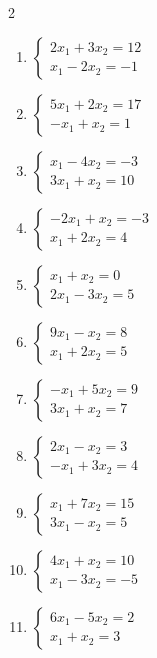 \begin{multicols}{2}
\begin{enumerate}[label=\arabic*., leftmargin=*]
\item $\begin{cases}2x_1+3x_2=12\\x_1-2x_2=-1\end{cases}$

\item $\begin{cases}5x_1+2x_2=17\\-x_1+x_2=1\end{cases}$

\item $\begin{cases}x_1-4x_2=-3\\3x_1+x_2=10\end{cases}$

\item $\begin{cases}-2x_1+x_2=-3\\x_1+2x_2=4\end{cases}$

\item $\begin{cases}x_1+x_2=0\\2x_1-3x_2=5\end{cases}$

\item $\begin{cases}9x_1-x_2=8\\x_1+2x_2=5\end{cases}$

\item $\begin{cases}-x_1+5x_2=9\\3x_1+x_2=7\end{cases}$

\item $\begin{cases}2x_1-x_2=3\\-x_1+3x_2=4\end{cases}$

\item $\begin{cases}x_1+7x_2=15\\3x_1-x_2=5\end{cases}$

\item $\begin{cases}4x_1+x_2=10\\x_1-3x_2=-5\end{cases}$

\item $\begin{cases}6x_1-5x_2=2\\x_1+x_2=3\end{cases}$

\end{enumerate}
\end{multicols}

